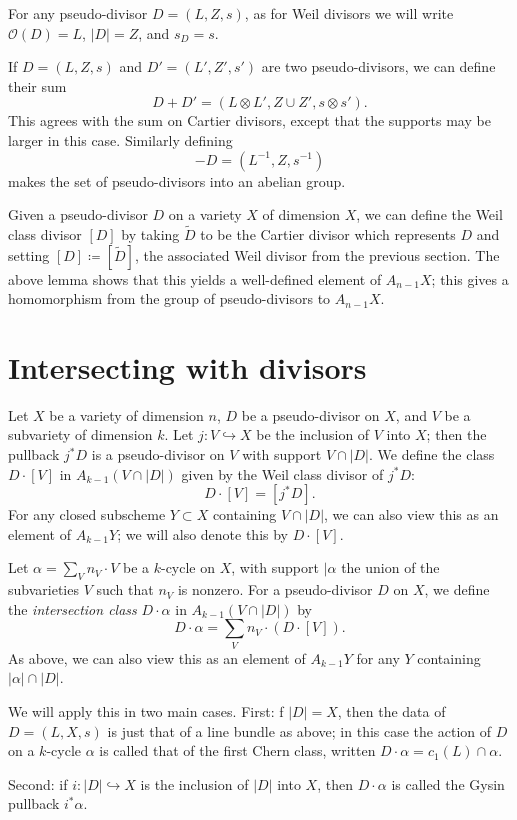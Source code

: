 \documentclass[leqno, openany]{memoir}
\theoremstyle{definition}
\theoremstyle{remark}
\theoremstyle{plain}
\theoremstyle{definition}
\theoremstyle{remark}
\newcommand{\mc}[1]{\mathcal{#1}}
\begin{document}
For any pseudo-divisor $D = (L,Z,s)$, as for Weil divisors we will write $\mc{O}(D) = L$, $|D| = Z$, and $s_D = s$.

If $D = (L,Z,s)$ and $D' = (L', Z', s')$ are two pseudo-divisors, we can define their sum \[ D + D' = (L \otimes L', Z \cup Z', s \otimes s') . \] This agrees with the sum on Cartier divisors, except that the supports may be larger in this case. Similarly defining \[ -D = (L^{-1}, Z, s^{-1}) \] makes the set of pseudo-divisors into an abelian group.

Given a pseudo-divisor $D$ on a variety $X$ of dimension $X$, we can define the Weil class divisor $[D]$ by taking $\tilde D$ to be the Cartier divisor which represents $D$ and setting $[D] \coloneqq [\tilde D]$, the associated Weil divisor from the previous section. The above lemma shows that this yields a well-defined element of $A_{n-1} X$; this gives a homomorphism from the group of pseudo-divisors to $A_{n-1} X$.

\section{Intersecting with divisors}
Let $X$ be a variety of dimension $n$, $D$ be a pseudo-divisor on $X$, and $V$ be a subvariety of dimension $k$. Let $j\colon V \hookrightarrow X$ be the inclusion of $V$ into $X$; then the pullback $j^* D$ is a pseudo-divisor on $V$ with support $V \cap |D|$. We define the class $D \cdot [V]$ in $A_{k-1} (V \cap |D|)$ given by the Weil class divisor of $j^* D$: \[ D \cdot [V] = [j^* D] . \] For any closed subscheme $Y \subset X$ containing $V \cap |D|$, we can also view this as an element of $A_{k-1} Y$; we will also denote this by $D \cdot [V]$.

Let $\alpha = \sum_V n_V \cdot V$ be a $k$-cycle on $X$, with support $|\alpha$ the union of the subvarieties $V$ such that $n_V$ is nonzero. For a pseudo-divisor $D$ on $X$, we define the \textit{intersection class} $D \cdot \alpha$ in $A_{k-1}(V \cap |D|)$ by \[ D \cdot \alpha = \sum_V n_V \cdot (D \cdot [V]) . \] As above, we can also view this as an element of $A_{k-1} Y$ for any $Y$ containing $|\alpha| \cap |D|$.

We will apply this in two main cases. First: f $|D| = X$, then the data of $D = (L, X, s)$ is just that of a line bundle as above; in this case the action of $D$ on a $k$-cycle $\alpha$ is called that of the first Chern class, written $D \cdot \alpha = c_1(L) \cap \alpha$.

Second: if $i\colon |D| \hookrightarrow X$ is the inclusion of $|D|$ into $X$, then $D \cdot \alpha$ is called the Gysin pullback $i^* \alpha$.
\end{document}
